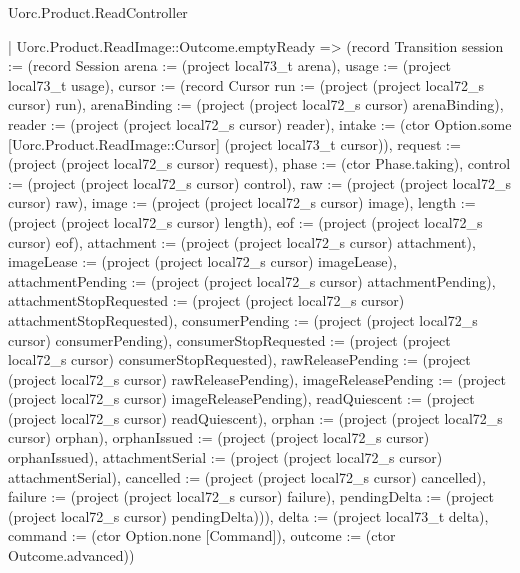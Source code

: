 \begin{lexlean}{Uorc.Product.ReadController}
\begin{semanticmodule}
{    | Uorc.Product.ReadImage::Outcome.emptyReady => (record Transition {session := (record Session {arena := (project local73_t arena), usage := (project local73_t usage), cursor := (record Cursor {run := (project (project local72_s cursor) run), arenaBinding := (project (project local72_s cursor) arenaBinding), reader := (project (project local72_s cursor) reader), intake := (ctor Option.some [Uorc.Product.ReadImage::Cursor] (project local73_t cursor)), request := (project (project local72_s cursor) request), phase := (ctor Phase.taking), control := (project (project local72_s cursor) control), raw := (project (project local72_s cursor) raw), image := (project (project local72_s cursor) image), length := (project (project local72_s cursor) length), eof := (project (project local72_s cursor) eof), attachment := (project (project local72_s cursor) attachment), imageLease := (project (project local72_s cursor) imageLease), attachmentPending := (project (project local72_s cursor) attachmentPending), attachmentStopRequested := (project (project local72_s cursor) attachmentStopRequested), consumerPending := (project (project local72_s cursor) consumerPending), consumerStopRequested := (project (project local72_s cursor) consumerStopRequested), rawReleasePending := (project (project local72_s cursor) rawReleasePending), imageReleasePending := (project (project local72_s cursor) imageReleasePending), readQuiescent := (project (project local72_s cursor) readQuiescent), orphan := (project (project local72_s cursor) orphan), orphanIssued := (project (project local72_s cursor) orphanIssued), attachmentSerial := (project (project local72_s cursor) attachmentSerial), cancelled := (project (project local72_s cursor) cancelled), failure := (project (project local72_s cursor) failure), pendingDelta := (project (project local72_s cursor) pendingDelta)})}), delta := (project local73_t delta), command := (ctor Option.none [Command]), outcome := (ctor Outcome.advanced)})
}
\end{semanticmodule}
\end{lexlean}
